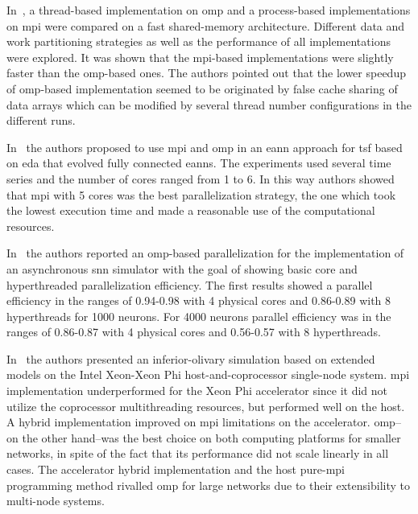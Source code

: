 \documentclass[10pt,journal,compsoc]{IEEEtran}
\begin{document}
In~\cite{Strey2003ACO}, a thread-based implementation on \gls{omp} and a process-based implementations on \gls{mpi} were compared on a fast shared-memory architecture. Different data and work partitioning strategies as well as the performance of all implementations were explored. It was shown that the \gls{mpi}-based implementations were slightly faster than the \gls{omp}-based ones. The authors pointed out that the lower speedup of \gls{omp}-based implementation seemed to be originated by false cache sharing of data arrays which can be modified by several thread number configurations in the different runs.

In~\cite{6232827} the authors proposed to use \gls{mpi} and \gls{omp} in an \gls{eann} approach for \gls{tsf} based on \gls{eda} that evolved fully connected \glspl{eann}. The experiments used several time series and the number of cores ranged from 1 to 6. In this way authors showed that \gls{mpi} with 5 cores was the best parallelization strategy, the one which took the lowest execution time and made a reasonable use of the computational resources.

In~\cite{6511739} the authors reported an \gls{omp}-based parallelization for the implementation of an asynchronous \gls{snn} simulator with the goal of showing basic core and hyperthreaded parallelization efficiency. The first results showed a parallel efficiency in the ranges of 0.94-0.98 with 4 physical cores and 0.86-0.89 with 8 hyperthreads for 1000 neurons. For 4000 neurons parallel efficiency was in the ranges of 0.86-0.87 with 4 physical cores and 0.56-0.57 with 8 hyperthreads.

In~\cite{Chatzikonstantis:2016:FID:2903150.2903477} the authors presented an inferior-olivary simulation based on extended  models on the Intel Xeon-Xeon Phi host-and-coprocessor single-node system. \gls{mpi} implementation underperformed for the Xeon Phi accelerator since it did not utilize the coprocessor multithreading resources, but performed well on the host. A hybrid implementation improved on \gls{mpi} limitations on the accelerator. \gls{omp}--on the other hand--was the best choice on both computing platforms for smaller networks, in spite of the fact that its performance did not scale linearly in all cases. The accelerator hybrid implementation and the host pure-\gls{mpi} programming method rivalled \gls{omp} for large networks due to their extensibility to multi-node systems.
\end{document}
